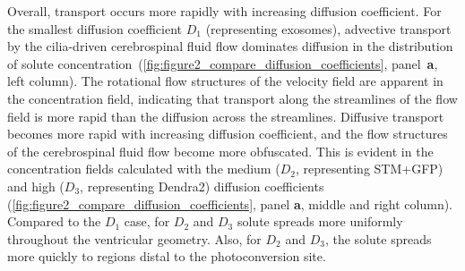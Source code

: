 \documentclass[fleqn]{wlscirep}
\begin{document}
Overall, transport occurs more rapidly with increasing diffusion coefficient. For the smallest diffusion coefficient $D_1$ (representing exosomes), advective transport by the cilia-driven cerebrospinal fluid flow dominates diffusion in the distribution of solute concentration~(\cref{fig:figure2_compare_diffusion_coefficients}, panel~\textbf{a}, left column). The rotational flow structures of the velocity field are apparent in the concentration field, indicating that transport along the streamlines of the flow field is more rapid than the diffusion across the streamlines. Diffusive transport becomes more rapid with increasing diffusion coefficient, and the flow structures of the cerebrospinal fluid flow become more obfuscated. This is evident in the concentration fields calculated with the medium ($D_2$, representing STM+GFP) and high ($D_3$, representing Dendra2) diffusion coefficients (\cref{fig:figure2_compare_diffusion_coefficients}, panel \textbf{a}, middle and right column). Compared to the $D_1$ case, for $D_2$ and $D_3$ solute spreads more uniformly throughout the ventricular geometry. Also, for $D_2$ and $D_3$, the solute spreads more quickly to regions distal to the photoconversion site. 
\end{document}

